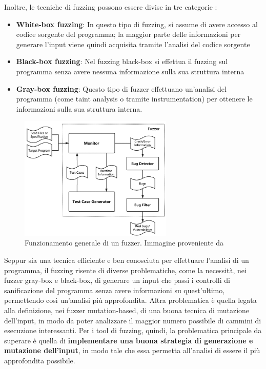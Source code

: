 \documentclass[../main.tex]{subfiles}
\begin{document}
Inoltre, le tecniche di fuzzing possono essere divise in tre categorie \cite{Fuzzing_survey}:
\begin{itemize}
    \item \textbf{White-box fuzzing}: In questo tipo di fuzzing, si assume di avere accesso al codice sorgente del programma; la maggior parte delle informazioni per generare l'input viene quindi acquisita tramite l'analisi del codice sorgente
    \item \textbf{Black-box fuzzing}: Nel fuzzing black-box si effettua il fuzzing sul programma senza avere nessuna informazione sulla sua struttura interna
    \item \textbf{Gray-box fuzzing}: Questo tipo di fuzzer effettuano un'analisi del programma (come taint analysis o tramite instrumentation) per ottenere le informazioni sulla sua struttura interna.
\end{itemize}
\begin{figure}[H]
    \centering
    \includegraphics[width = 0.65\textwidth]{../images/Fuzzing.png}
    \caption{Funzionamento generale di un fuzzer. Immagine proveniente da \cite{Fuzzing_soa}}
\end{figure}
Seppur sia una tecnica efficiente e ben conosciuta per effettuare l'analisi di un programma, il fuzzing risente di diverse problematiche, come la necessità, nei fuzzer gray-box e black-box, di generare un input che passi i controlli di sanificazione del programma senza avere
informazioni su quest'ultimo, permettendo così un'analisi più approfondita. Altra problematica è quella legata alla definizione, nei fuzzer mutation-based, di una buona tecnica di mutazione dell'input, in modo da poter analizzare il maggior numero
possibile di cammini di esecuzione interessanti. Per i tool di fuzzing, quindi, la problematica principale da superare è quella di \textbf{implementare una buona strategia di generazione e mutazione dell'input}, in modo tale che essa permetta all'analisi di essere il più approfondita possibile.
\end{document}
